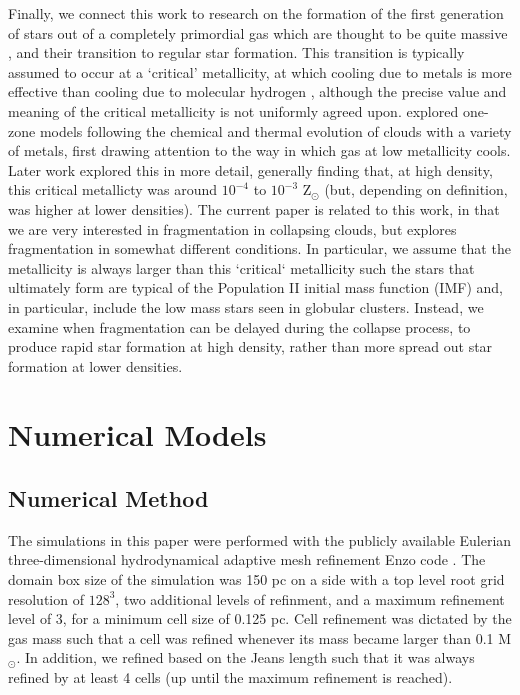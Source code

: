 \documentclass[useAMS,usenatbib]{mn2e}
\begin{document}
Finally, we connect this work to research on the formation of the first generation of stars out of a completely primordial gas which are thought to be quite massive \citep[for reviews see:][]{Bromm2011, Glover2013}, and their transition to regular star formation.  This transition is typically assumed to occur at a `critical' metallicity, at which cooling due to metals is more effective than cooling due to molecular hydrogen \citep{Bromm2001}, although the precise value and meaning of the critical metallicity is not uniformly agreed upon.  \citet{Omukai2000} explored one-zone models following the chemical and thermal evolution of clouds with a variety of metals, first drawing attention to the way in which gas at low metallicity cools.  Later work \citet{Bromm2003, Omukai2005, Santori2006} explored this in more detail, generally finding that, at high density, this critical metallicty was around $10^{-4}$ to $10^{-3}$ Z$_{\odot}$ (but, depending on definition, was higher at lower densities).  The current paper is related to this work, in that we are very interested in fragmentation in collapsing clouds, but explores fragmentation in somewhat different conditions.  In particular, we assume that the metallicity is always larger than this `critical` metallicity such the stars that ultimately form are typical of the Population II initial mass function (IMF) and, in particular, include the low mass stars seen in globular clusters.  Instead, we examine when fragmentation can be delayed during the collapse process, to produce rapid star formation at high density, rather than more spread out star formation at lower densities. 


%
\section{Numerical Models}
\label{sec:numerical}
\subsection{Numerical Method}

The simulations in this paper were performed with the publicly available Eulerian three-dimensional
hydrodynamical adaptive mesh refinement Enzo code \citep{Bryan2014}. The domain
box size of the simulation was 150 pc on a side with a top level root grid resolution of $128^3$, two
additional levels of refinment, and a maximum refinement level of 3, for a minimum cell size of 0.125 pc.  Cell refinement was dictated 
by the gas mass such that a cell was refined whenever its mass became larger than 0.1 M$_\odot$.
In addition, we refined based on the Jeans length such that it was always refined by at least 4 cells (up until
the maximum refinement is reached).
\end{document}
